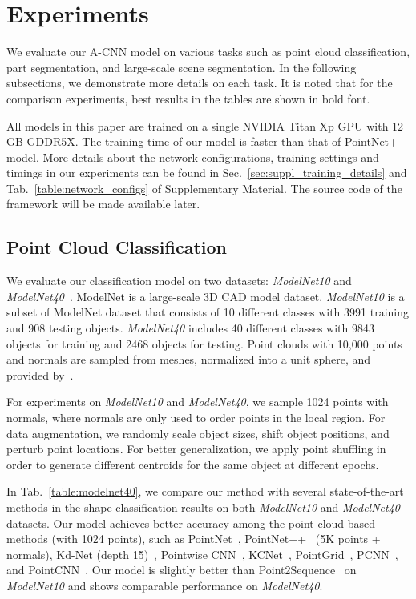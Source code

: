 \documentclass[10pt,twocolumn,letterpaper]{article}
\begin{document}
\section{Experiments}\vspace{-1mm}
\label{sec:experiments}
We evaluate our A-CNN model on various tasks such as point cloud classification, part segmentation, and large-scale scene segmentation. In the following subsections, we demonstrate more details on each task. It is noted that for the comparison experiments, best results in the tables are shown in bold font.

All models in this paper are trained on a single NVIDIA Titan Xp GPU with 12 GB GDDR5X. The training time of our model is faster than that of PointNet++ model. More details about the network configurations, training settings and timings in our experiments can be found in Sec.~\ref{sec:suppl_training_details} and Tab.~\ref{table:network_configs} of Supplementary Material. The source code of the framework will be made available later.
\vspace{-1mm}
\subsection{Point Cloud Classification}\vspace{-1mm}
We evaluate our classification model on two datasets: \textit{ModelNet10} and \textit{ModelNet40}~\cite{wu20153d}. ModelNet is a large-scale 3D CAD model dataset. \textit{ModelNet10} is a subset of ModelNet dataset that consists of 10 different classes with 3991 training and 908 testing objects. \textit{ModelNet40} includes 40 different classes with 9843 objects for training and 2468 objects for testing. Point clouds with 10,000 points and normals are sampled from meshes, normalized into a unit sphere, and provided by~\cite{qi2017pointnet++}.

For experiments on \textit{ModelNet10} and \textit{ModelNet40}, we sample 1024 points with normals, where normals are only used to order points in the local region. For data augmentation, we randomly scale object sizes, shift object positions, and perturb point locations. For better generalization, we apply point shuffling in order to generate different centroids for the same object at different epochs.

In Tab.~\ref{table:modelnet40}, we compare our method with several state-of-the-art methods in the shape classification results on both \textit{ModelNet10} and \textit{ModelNet40} datasets. Our model achieves better accuracy among the point cloud based methods (with 1024 points), such as PointNet~\cite{qi2017pointnet}, PointNet++~\cite{qi2017pointnet++} (5K points + normals), Kd-Net (depth 15)~\cite{klokov2017escape}, Pointwise CNN~\cite{hua2018pointwise}, KCNet~\cite{shen2018mining}, PointGrid~\cite{le2018pointgrid}, PCNN~\cite{atzmon2018point}, and PointCNN~\cite{li2018pointcnn}. Our model is slightly better than Point2Sequence~\cite{liu2018point2sequence} on \emph{ModelNet10} and shows comparable performance on \emph{ModelNet40}.
\end{document}
